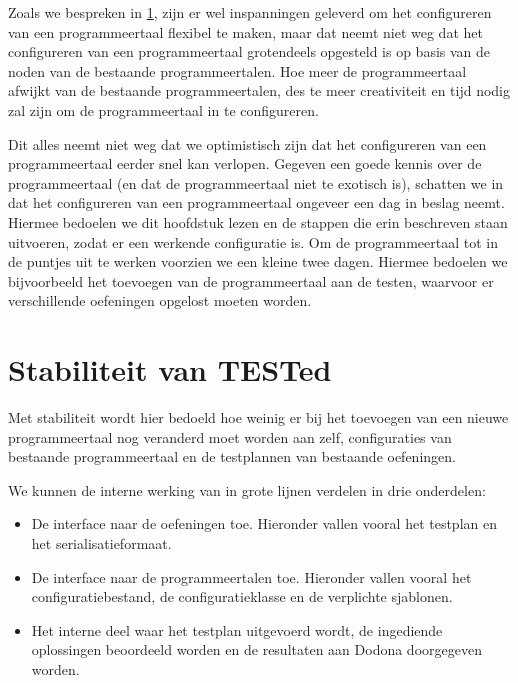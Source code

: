 Zoals we bespreken in \cref{sec:stabiliteit-van-tested}, zijn er wel inspanningen geleverd om het configureren van een programmeertaal flexibel te maken, maar dat neemt niet weg dat het configureren van een programmeertaal grotendeels opgesteld is op basis van de noden van de bestaande programmeertalen.
Hoe meer de programmeertaal afwijkt van de bestaande programmeertalen, des te meer creativiteit en tijd nodig zal zijn om de programmeertaal in \tested{} te configureren.

Dit alles neemt niet weg dat we optimistisch zijn dat het configureren van een programmeertaal eerder snel kan verlopen.
Gegeven een goede kennis over de programmeertaal (en dat de programmeertaal niet te exotisch is), schatten we in dat het configureren van een programmeertaal ongeveer een dag in beslag neemt.
Hiermee bedoelen we dit hoofdstuk lezen en de stappen die erin beschreven staan uitvoeren, zodat er een werkende configuratie is.
Om de programmeertaal tot in de puntjes uit te werken voorzien we een kleine twee dagen.
Hiermee bedoelen we bijvoorbeeld het toevoegen van de programmeertaal aan de testen, waarvoor er verschillende oefeningen opgelost moeten worden.


\section{Stabiliteit van TESTed}\label{sec:stabiliteit-van-tested}

Met stabiliteit wordt hier bedoeld hoe weinig er bij het toevoegen van een nieuwe programmeertaal nog veranderd moet worden aan \tested{} zelf, configuraties van bestaande programmeertaal en de testplannen van bestaande oefeningen.

We kunnen de interne werking van \tested{} in grote lijnen verdelen in drie onderdelen:

\begin{itemize}
    \item De interface naar de oefeningen toe.
    Hieronder vallen vooral het testplan en het serialisatieformaat.
    \item De interface naar de programmeertalen toe.
    Hieronder vallen vooral het configuratiebestand, de configuratieklasse en de verplichte sjablonen.
    \item Het interne deel waar het testplan uitgevoerd wordt, de ingediende oplossingen beoordeeld worden en de resultaten aan Dodona doorgegeven worden.
\end{itemize}

